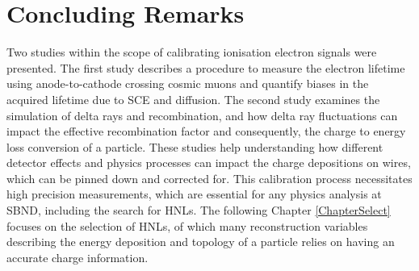\section{Concluding Remarks}
\label{sec:concludeDeltaRay}

Two studies within the scope of calibrating ionisation electron signals were presented. 
The first study describes a procedure to measure the electron lifetime using anode-to-cathode crossing cosmic muons and quantify biases in the acquired lifetime due to SCE and diffusion. 
The second study examines the simulation of delta rays and recombination, and how delta ray fluctuations can impact the effective recombination factor and consequently, the charge to energy loss conversion of a particle.
These studies help understanding how different detector effects and physics processes can impact the charge depositions on wires, which can be pinned down and corrected for.
This calibration process necessitates high precision measurements, which are essential for any physics analysis at SBND, including the search for HNLs.
The following Chapter \ref{ChapterSelect} focuses on the selection of HNLs, of which many reconstruction variables describing the energy deposition and topology of a particle relies on having an accurate charge information. 

